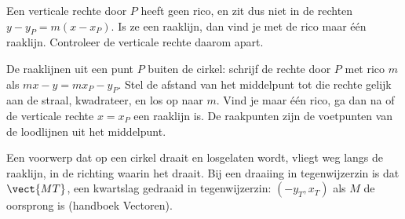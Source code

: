 Een verticale rechte door $P$ heeft geen rico, en zit dus niet in de rechten $y - y_P = m(x - x_P)$. Is ze een raaklijn, dan vind je met de rico maar één raaklijn. Controleer de verticale rechte daarom apart.


\begin{werkwijze}
De raaklijnen uit een punt $P$ buiten de cirkel: schrijf de rechte door $P$ met rico $m$ als $mx - y = m x_P - y_P$. Stel de afstand van het middelpunt tot die rechte gelijk aan de straal, kwadrateer, en los op naar $m$. Vind je maar één rico, ga dan na of de verticale rechte $x = x_P$ een raaklijn is. De raakpunten zijn de voetpunten van de loodlijnen uit het middelpunt.
\end{werkwijze}

\begin{oefeningen}
\end{oefeningen}

Een voorwerp dat op een cirkel draait en losgelaten wordt, vliegt weg langs de raaklijn, in de richting waarin het draait. Bij een draaiing in tegenwijzerzin is dat $\vect{MT}$, een kwartslag gedraaid in tegenwijzerzin: $(-y_T, x_T)$ als $M$ de oorsprong is (handboek Vectoren).

